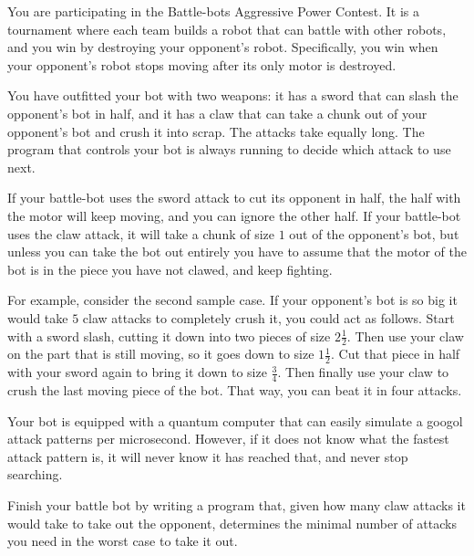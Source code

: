 




You are participating in the Battle-bots Aggressive Power Contest. It is a tournament where
each team builds a robot that can battle with other robots, and you win by destroying your
opponent's robot. Specifically, you win when your opponent's robot stops moving
after its only motor is destroyed.

You have outfitted your bot with two weapons: it has a sword that can slash the opponent's bot in
half, and it has a claw that can take a chunk out of your opponent's bot and crush it into
scrap. The attacks take equally long. The program that controls your bot is always running to
decide which attack to use next.

If your battle-bot uses the sword attack to cut its opponent in half, the half
with the motor will keep moving, and you can ignore the other half. If your
battle-bot uses the claw attack, it will take a chunk of size $1$ out of the opponent's bot,
but unless you can take the bot out entirely you have to assume that the motor
of the bot is in the piece you have not clawed, and keep fighting.

For example, consider the second sample case.
If your opponent's bot is so big it would take $5$ claw attacks to completely crush
it, you could act as follows. Start with a sword slash, cutting it down into two pieces of size
$2\frac12$. Then use your claw on the part that is still moving, so it goes down to size $1\frac12$. Cut that
piece in half with your sword again to bring it down to size $\frac34$. Then finally use your claw to
crush the last moving piece of the bot. That way, you can beat it in four attacks.

Your bot is equipped with a quantum computer that can easily simulate a googol attack patterns
per microsecond. However, if it does not know what the fastest attack pattern is, it will never
know it has reached that, and never stop searching.

Finish your battle bot by writing a program that, given how many claw attacks it would take to
take out the opponent, determines the minimal number of attacks you need in the
worst case to take it out.

